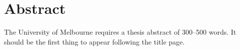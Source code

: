 %
\chapter*{Abstract}
\onehalfspace
%
The University of Melbourne requires a thesis abstract of 300--500 words. It should be the first thing to appear following the title page.
%